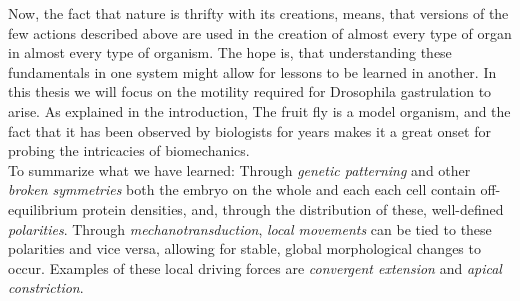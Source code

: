 
Now, the fact that nature is thrifty with its creations, means, that versions of the few actions described above are used in the creation of almost every type of organ in almost every type of organism. The hope is, that understanding these fundamentals in one system might allow for lessons to be learned in another. In this thesis we will focus on the motility required for Drosophila gastrulation to arise. As explained in the introduction, The fruit fly is a model organism, and the fact that it has been observed by biologists for years makes it a great onset for probing the intricacies of biomechanics.\\



To summarize what we have learned:
Through \textit{genetic patterning} and other \textit{broken symmetries} both the embryo on the whole and each each cell contain off-equilibrium protein densities, and, through the distribution of these, well-defined \textit{polarities}.
Through \textit{mechanotransduction}, \textit{local movements} can be tied to these polarities and vice versa, allowing for stable, global morphological changes to occur. Examples of these local driving forces are \textit{convergent extension} and \textit{apical constriction}.





